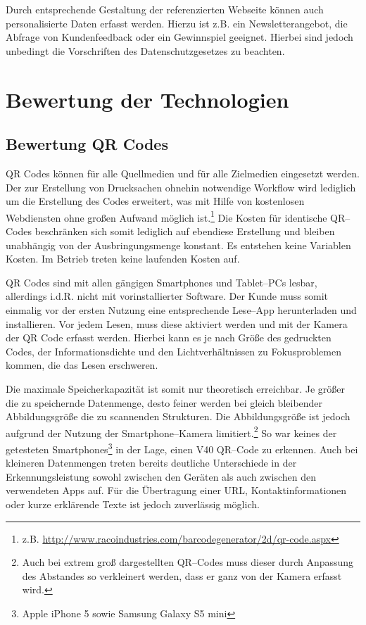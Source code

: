 Durch entsprechende Gestaltung der referenzierten Webseite können auch personalisierte Daten erfasst werden. Hierzu ist z.B. ein Newsletterangebot, die Abfrage von Kundenfeedback oder ein Gewinnspiel geeignet. Hierbei sind jedoch unbedingt die Vorschriften des Datenschutzgesetzes zu beachten.


\newpage
\section{Bewertung der Technologien} %
\label{sec:bewertung}

\subsection{Bewertung QR Codes} %
\label{sub:bewertung_qr_codes}
QR Codes können für alle Quellmedien und für alle Zielmedien eingesetzt werden. Der zur Erstellung von Drucksachen ohnehin notwendige Workflow wird lediglich um die Erstellung des Codes erweitert, was mit Hilfe von kostenlosen Webdiensten ohne großen Aufwand möglich ist.\footnote{z.B. \url{http://www.racoindustries.com/barcodegenerator/2d/qr-code.aspx}} Die Kosten für identische QR–Codes beschränken sich somit lediglich auf ebendiese Erstellung und bleiben unabhängig von der Ausbringungsmenge konstant. Es entstehen keine Variablen Kosten. Im Betrieb treten keine laufenden Kosten auf.

QR Codes sind mit allen gängigen Smartphones und Tablet–PCs lesbar, allerdings i.d.R. nicht mit vorinstallierter Software. Der Kunde muss somit einmalig vor der ersten Nutzung eine entsprechende Lese–App herunterladen und installieren. Vor jedem Lesen, muss diese aktiviert werden und mit der Kamera der QR Code erfasst werden. Hierbei kann es je nach Größe des gedruckten Codes, der Informationsdichte und den Lichtverhältnissen zu Fokusproblemen kommen, die das Lesen erschweren.   

Die maximale Speicherkapazität ist somit nur theoretisch erreichbar. Je größer die zu speichernde Datenmenge, desto feiner werden bei gleich bleibender Abbildungsgröße die zu scannenden Strukturen. Die Abbildungsgröße ist jedoch aufgrund der Nutzung der Smartphone–Kamera limitiert.\footnote{Auch bei extrem groß dargestellten QR–Codes muss dieser durch Anpassung des Abstandes so verkleinert werden, dass er ganz von der Kamera erfasst wird.} So war keines der getesteten Smartphones\footnote{Apple iPhone 5 sowie Samsung Galaxy S5 mini} in der Lage, einen V40 QR–Code zu erkennen. Auch bei kleineren Datenmengen treten bereits deutliche Unterschiede in der Erkennungsleistung sowohl zwischen den Geräten als auch zwischen den verwendeten Apps auf. Für die Übertragung einer \ac{URL}, Kontaktinformationen oder kurze erklärende Texte ist jedoch zuverlässig möglich.

